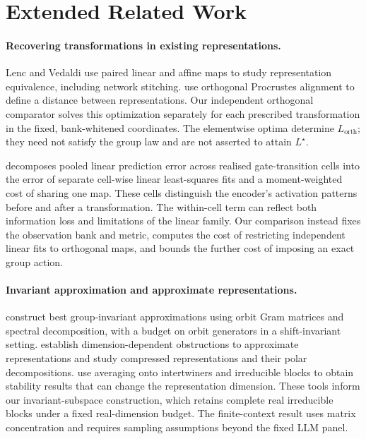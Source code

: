 \section{Extended Related Work}
\label{app:related-work}
\paragraph{Recovering transformations in existing representations.}
Lenc and Vedaldi \citeyearpar{lenc2015understanding} use paired linear and affine maps to study representation equivalence, including network stitching. \citet[Section~2.3 and Appendix~C.2]{williams2021shape} use orthogonal Procrustes alignment to define a distance between representations. Our independent orthogonal comparator solves this optimization separately for each prescribed transformation in the fixed, bank-whitened coordinates. The elementwise optima determine $L_{\mathrm{orth}}$; they need not satisfy the group law and are not asserted to attain $L^\star$.

\citet[arXiv v1, Section~III-C]{sun2026transformationlaws} decomposes pooled linear prediction error across realised gate-transition cells into the error of separate cell-wise linear least-squares fits and a moment-weighted cost of sharing one map. These cells distinguish the encoder's activation patterns before and after a transformation. The within-cell term can reflect both information loss and limitations of the linear family. Our comparison instead fixes the observation bank and metric, computes the cost of restricting independent linear fits to orthogonal maps, and bounds the further cost of imposing an exact group action.

\paragraph{Invariant approximation and approximate representations.}
\citet{barbieri2020approximation} construct best group-invariant approximations using orbit Gram matrices and spectral decomposition, with a budget on orbit generators in a shift-invariant setting. \citet{moore2015approximate} establish dimension-dependent obstructions to approximate representations and study compressed representations and their polar decompositions. \citet{gowers2017inverse} use averaging onto intertwiners and irreducible blocks to obtain stability results that can change the representation dimension. These tools inform our invariant-subspace construction, which retains complete real irreducible blocks under a fixed real-dimension budget. The finite-context result uses matrix concentration \citep{tropp2012user} and requires sampling assumptions beyond the fixed LLM panel.

